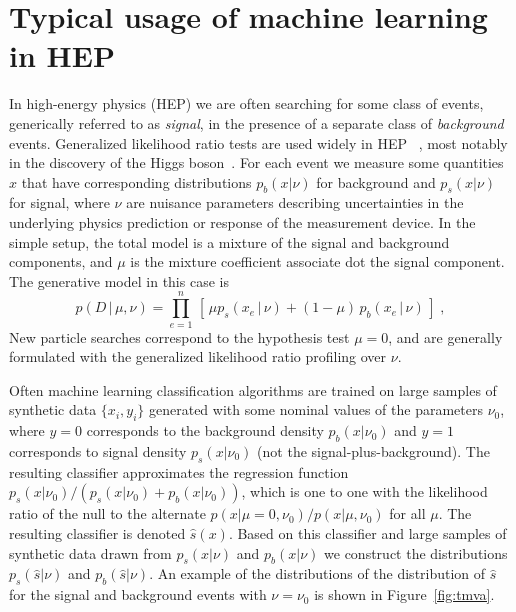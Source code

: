 \documentclass[11pt, oneside]{article}   	%
\begin{document}
\section{Typical usage of machine learning in HEP}

In high-energy physics (HEP) we are often searching for some 
class of events, generically referred to as \textit{signal}, in the presence of a separate class 
of \textit{background} events. Generalized likelihood ratio tests are used widely in HEP ~\citep{Cowan:2010js}, most notably in the discovery of the Higgs boson~\citep{Aad:2012tfa,Chatrchyan:2012ufa}. For each event we measure some quantities $x$ that have corresponding distributions 
$p_b(x|\nu)$ for background and $p_s(x|\nu)$ for signal, where $\nu$ are nuisance parameters describing 
uncertainties in the underlying physics prediction or response of the measurement device. In the simple setup, the 
total model is a mixture of the signal and background components, and $\mu$ is the mixture coefficient associate 
dot the signal component. The generative model in this case is
\begin{equation}\label{eq:hepGen}
p( D \,|\, \mu, \nu) = \prod_{e=1}^n \, \left[\, \mu p_s( x_e \, |\,  \nu)  + (1-\mu)\, p_b( x_e \,|\, \nu) \,\right] \; ,
\end{equation}
New particle searches correspond to the hypothesis test $\mu=0$, and are generally formulated with the
generalized likelihood ratio profiling over $\nu$.


Often machine learning classification algorithms are trained on large samples of synthetic data $\{x_i, y_i\}$ generated with some nominal values of the parameters $\nu_0$, where $y=0$ corresponds to the background density $p_b(x|\nu_0)$  and $y=1$ corresponds to signal density $p_s(x|\nu_0)$ (not the signal-plus-background). The resulting classifier approximates the regression function $p_s(x|\nu_0)/(p_s(x|\nu_0)+p_b(x|\nu_0))$, which is one to one with the likelihood ratio of the null to the alternate $p(x|\mu=0,\nu_0)/p(x|\mu,\nu_0)$ for all $\mu$. The resulting classifier is denoted $\hat s(x)$. Based on this classifier and large samples of synthetic data drawn from $p_s(x | \nu)$ and $p_b(x | \nu)$ we construct the distributions  $p_s(\hat s | \nu)$ and $p_b(\hat s | \nu)$. An example of the distributions of the distribution of $\hat s$ for the signal and background events with $\nu=\nu_0$ is shown in Figure~\ref{fig:tmva}.
\end{document}
